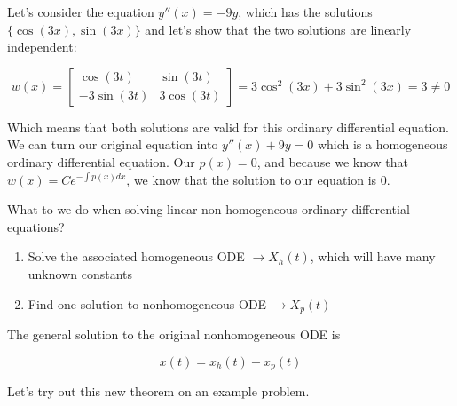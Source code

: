   \begin{problem}
    Let's consider the equation $y''(x)=-9y$, which has the solutions $\{\cos(3x),\sin(3x)\}$ and let's show that the two solutions are linearly independent:

  \[
    w(x)=\begin{bmatrix} \cos(3t)&\sin(3t)\\-3\sin(3t)&3\cos(3t) \end{bmatrix}
    =3\cos^2(3x)+3\sin^2(3x)=3\neq0
  \]
  
  Which means that both solutions are valid for this ordinary differential equation. We can turn our original equation into $y''(x)+9y=0$ which is a homogeneous ordinary differential equation. Our $p(x)=0$, and because we know that $w(x)=Ce^{-\int p(x)dx}$, we know that the solution to our equation is 0.
  \end{problem}

  \begin{theorem}
    What to we do when solving linear non-homogeneous ordinary differential equations?
    \begin{enumerate}
      \item Solve the associated homogeneous ODE $\to X_h(t)$, which will have many unknown constants
      \item Find one solution to nonhomogeneous ODE $\to X_p(t)$
    \end{enumerate}

    The general solution to the original nonhomogeneous ODE is 

    \[
      x(t)=x_h(t)+x_p(t)
    \]
  \end{theorem}

  Let's try out this new theorem on an example problem.

